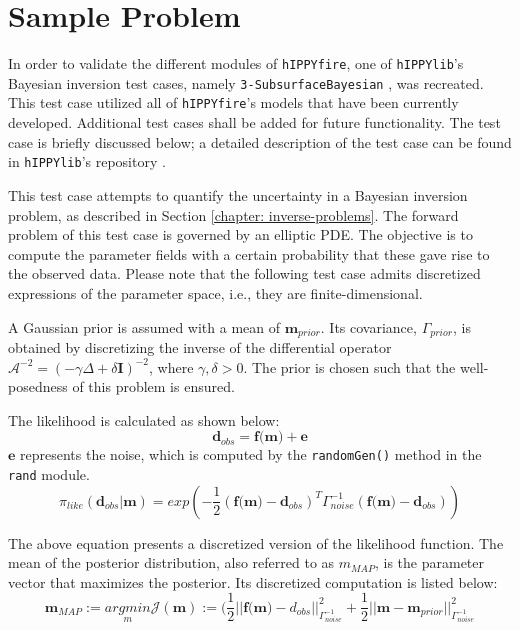 \chapter{Sample Problem}
\label{chapter:sample-problem}

In order to validate the different modules of \texttt{hIPPYfire}, one of \texttt{hIPPYlib}'s Bayesian inversion test cases, namely \texttt{3-SubsurfaceBayesian} \cite{Villa_hIPPYlib_An_Extensible_2020}, was recreated. This test case utilized all of \texttt{hIPPYfire}'s models that have been currently developed. Additional test cases shall be added for future functionality. The test case is briefly discussed below; a detailed description of the test case can be found in \texttt{hIPPYlib}'s repository \cite{Villa_hIPPYlib_An_Extensible_2020}.

This test case attempts to quantify the uncertainty in a Bayesian inversion problem, as described in Section \ref{chapter: inverse-problems}. The forward problem of this test case is governed by an elliptic PDE. The objective is to compute the parameter fields with a certain probability that these gave rise to the observed data. Please note that the following test case admits discretized expressions of the parameter space, i.e., they are finite-dimensional.

A Gaussian prior is assumed with a mean of $\textbf{m}_{prior}$. Its covariance, \textbf{$\Gamma_{prior}$}, is obtained by discretizing the inverse of the differential operator $\mathcal{A}^{-2} = (-\gamma\Delta + \delta\textbf{I})^{-2}$, where $\gamma, \delta > 0 $. The prior is chosen such that the well-posedness of this problem is ensured.

The likelihood is calculated as shown below:
\begin{equation}
    \textbf{d}_{obs} = \textbf{f(m)} + \textbf{e}
\end{equation}
$\textbf{e}$ represents the noise, which is computed by the \texttt{randomGen()} method in the \texttt{rand} module.
\begin{equation}
    \pi_{like}(\textbf{d}_{obs} | \textbf{m}) = exp(-\frac{1}{2}(\textbf{f(m)} -\textbf{d}_{obs})^T\Gamma^{-1}_{noise}(\textbf{f(m)} -\textbf{d}_{obs}))
\end{equation}

The above equation presents a discretized version of the likelihood function. The mean of the posterior distribution, also referred to as \textbf{${m_{MAP}} $}, is the parameter vector that maximizes the posterior. Its discretized computation is listed below:
\begin{equation}
    \textbf{m}_{MAP} := \underset{m}{arg min}\mathcal{J}(\textbf{m}) := (\frac{1}{2} || \textbf{f(m)} - d_{obs} ||^2_{\Gamma_{noise}^{-1}} + \frac{1}{2}|| \textbf{m} - \textbf{m}_{prior} || ^2_{\Gamma_{noise}^{-1}}
\end{equation}

